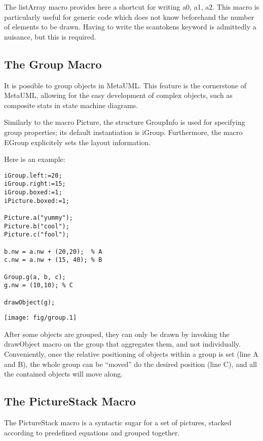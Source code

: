 \documentclass{article}
\newcommand{\code}{\ttfamily}
\begin{document}
The {\code listArray} macro provides here a shortcut for writing
{\code a0, a1, a2}. This macro is particularly useful for generic
code which does not know beforehand the number of elements to be drawn.
Having to write the {\code scantokens} keyword is admittedly a nuisance, but
this is required.


\subsection{The Group Macro}

It is possible to group objects in MetaUML. This feature is the cornerstone
of MetaUML, allowing for the easy development of complex objects, such as
composite stats in state machine diagrams.

Similarly to the macro {\code Picture}, the structure {\code GroupInfo}
is used for specifying group properties; its default instantiation is
{\code iGroup}. Furthermore, the macro {\code EGroup} explicitely sets the
layout information.

Here is an example:

\begin{multicols}{2}
\begin{verbatim}
iGroup.left:=20;
iGroup.right:=15;
iGroup.boxed:=1;
iPicture.boxed:=1;

Picture.a("yummy");
Picture.b("cool");
Picture.c("fool");

b.nw = a.nw + (20,20);  % A
c.nw = a.nw + (15, 40); % B

Group.g(a, b, c);
g.nw = (10,10); % C

drawObject(g);
\end{verbatim}
\columnbreak
\hspace{1cm}\texttt{[image: fig/group.1]}
\end{multicols}

After some objects are grouped, they can only be drawn
by invoking the {\code drawObject} macro on the group that aggregates them, and not individually.
Conveniently, once the relative positioning of objects within a group is set (line A and B), the whole
group can be ``moved'' do the desired position (line C), and all the contained objects will move along.

\subsection{The PictureStack Macro}

The {\code PictureStack} macro is a syntactic sugar for a set of pictures,
stacked according to predefined equations and grouped together.
\end{document}
